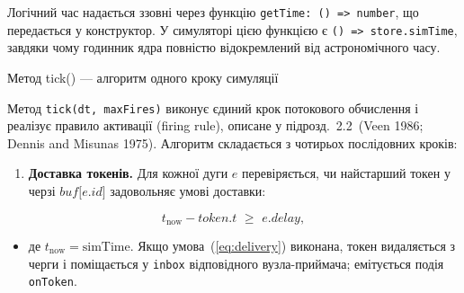 Логічний час надається ззовні через функцію
\texttt{getTime:\ ()\ =\textgreater{}\ number}, що передається у
конструктор. У симуляторі цією функцією є
\texttt{()\ =\textgreater{}\ store.simTime}, завдяки чому годинник ядра
повністю відокремлений від астрономічного часу.

Метод tick() --- алгоритм одного кроку симуляції

Метод \texttt{tick(dt,\ maxFires)} виконує єдиний крок потокового
обчислення і реалізує правило активації (firing rule), описане у
підрозд.~2.2~(Veen 1986; Dennis and Misunas 1975). Алгоритм складається
з чотирьох послідовних кроків:

\begin{enumerate}
\def\labelenumi{\arabic{enumi}.}
\item
  \textbf{Доставка токенів.} Для кожної дуги \(e\) перевіряється, чи
  найстарший токен у черзі \(buf\lbrack e.id\rbrack\) задовольняє умові
  доставки:
\end{enumerate}

\[t_{\text{now}} - token.t\mspace{6mu} \geq \mspace{6mu} e.delay,\]

\begin{itemize}
\item
  де \(t_{\text{now}} = \text{simTime}\). Якщо
  умова~(\hyperref[eq:delivery]{{[}eq:delivery{]}}) виконана, токен
  видаляється з черги і поміщається у \texttt{inbox} відповідного
  вузла-приймача; емітується подія \texttt{onToken}.
\end{itemize}

